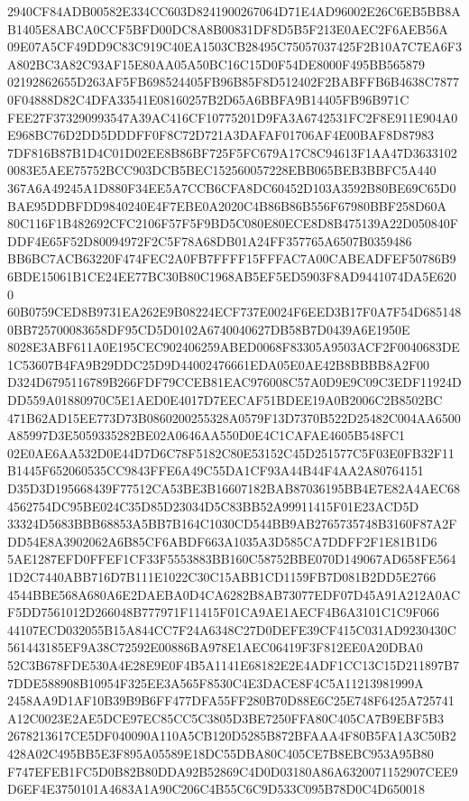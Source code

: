 \documentclass[UTF8,fontset=fandol,zihao=-4,a4paper]{ctexart}
\begin{document}
{{2940CF84ADB00582E334CC603D8241900267064D71E4AD96002E26C6EB5BB8AB1405E8ABCA0CCF5BFD00DC8A8B00831DF8D5B5F213E0AEC2F6AEB56A
09E07A5CF49DD9C83C919C40EA1503CB28495C75057037425F2B10A7C7EA6F3A802BC3A82C93AF15E80AA05A50BC16C15D0F54DE8000F495BB565879
02192862655D263AF5FB698524405FB96B85F8D512402F2BABFFB6B4638C78770F04888D82C4DFA33541E08160257B2D65A6BBFA9B14405FB96B971C
FEE27F373290993547A39AC416CF10775201D9FA3A6742531FC2F8E911E904A0E968BC76D2DD5DDDFF0F8C72D721A3DAFAF01706AF4E00BAF8D87983
7DF816B87B1D4C01D02EE8B86BF725F5FC679A17C8C94613F1AA47D36331020083E5AEE75752BCC903DCB5BEC152560057228EBB065BEB3BBFC5A440
367A6A49245A1D880F34EE5A7CCB6CFA8DC60452D103A3592B80BE69C65D0BAE95DDBFDD9840240E4F7EBE0A2020C4B86B86B556F67980BBF258D60A
80C116F1B482692CFC2106F57F5F9BD5C080E80ECE8D8B475139A22D050840FDDF4E65F52D80094972F2C5F78A68DB01A24FF357765A6507B0359486
BB6BC7ACB63220F474FEC2A0FB7FFFF15FFFAC7A00CABEADFEF50786B96BDE15061B1CE24EE77BC30B80C1968AB5EF5ED5903F8AD9441074DA5E6200
60B0759CED8B9731EA262E9B08224ECF737E0024F6EED3B17F0A7F54D6851480BB725700083658DF95CD5D0102A6740040627DB58B7D0439A6E1950E
8028E3ABF611A0E195CEC902406259ABED0068F83305A9503ACF2F0040683DE1C53607B4FA9B29DDC25D9D44002476661EDA05E0AE42B8BBBB8A2F00
D324D6795116789B266FDF79CCEB81EAC976008C57A0D9E9C09C3EDF11924DDD559A01880970C5E1AED0E4017D7EECAF51BDEE19A0B2006C2B8502BC
471B62AD15EE773D73B0860200255328A0579F13D7370B522D25482C004AA6500A85997D3E5059335282BE02A0646AA550D0E4C1CAFAE4605B548FC1
02E0AE6AA532D0E44D7D6C78F5182C80E53152C45D251577C5F03E0FB32F11B1445F652060535CC9843FFE6A49C55DA1CF93A44B44F4AA2A80764151
D35D3D195668439F77512CA53BE3B16607182BAB87036195BB4E7E82A4AEC684562754DC95BE024C35D85D23034D5C83BB52A99911415F01E23ACD5D
33324D5683BBB68853A5BB7B164C1030CD544BB9AB2765735748B3160F87A2FDD54E8A3902062A6B85CF6ABDF663A1035A3D585CA7DDFF2F1E81B1D6
5AE1287EFD0FFEF1CF33F5553883BB160C58752BBE070D149067AD658FE5641D2C7440ABB716D7B111E1022C30C15ABB1CD1159FB7D081B2DD5E2766
4544BBE568A680A6E2DAEBA0D4CA6282B8AB73077EDF07D45A91A212A0ACF5DD7561012D266048B777971F11415F01CA9AE1AECF4B6A3101C1C9F066
44107ECD032055B15A844CC7F24A6348C27D0DEFE39CF415C031AD9230430C561443185EF9A38C72592E00886BA978E1AEC06419F3F812EE0A20DBA0
52C3B678FDE530A4E28E9E0F4B5A1141E68182E2E4ADF1CC13C15D211897B77DDE588908B10954F325EE3A565F8530C4E3DACE8F4C5A11213981999A
2458AA9D1AF10B39B9B6FF477DFA55FF280B70D88E6C25E748F6425A725741A12C0023E2AE5DCE97EC85CC5C3805D3BE7250FFA80C405CA7B9EBF5B3
2678213617CE5DF040090A110A5CB120D5285B872BFAAA4F80B5FA1A3C50B2428A02C495BB5E3F895A05589E18DC55DBA80C405CE7B8EBC953A95B80
F747EFEB1FC5D0B82B80DDA92B52869C4D0D03180A86A6320071152907CEE9D6EF4E3750101A4683A1A90C206C4B55C6C9D533C095B78D0C4D650018
}}
\end{document}
